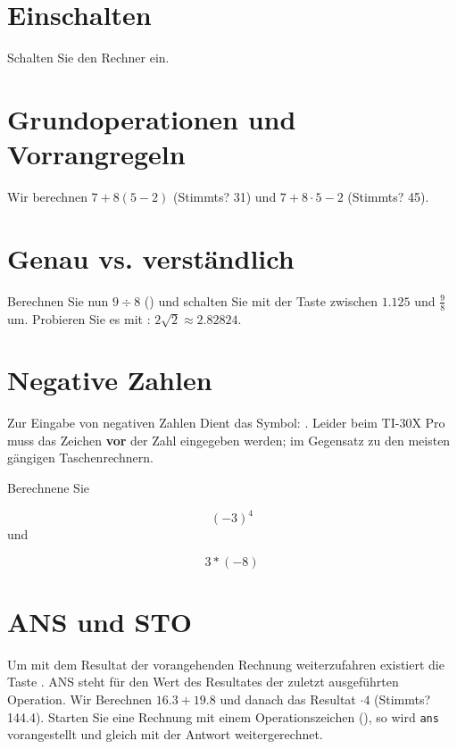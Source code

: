 

\renewcommand{\metaHeaderLine}{Arbeitsblatt}
\renewcommand{\arbeitsblattTitel}{Taschenrechner TI-30 Pro MathPrint
--- Einführung}

\arbeitsblattHeader{}

\section{Einschalten}
Schalten Sie den Rechner ein. 


\section{Grundoperationen und Vorrangregeln}
Wir berechnen $7 + 8(5-2)$  (Stimmts? 31) und $7 + 8\cdot 5 - 2$ (Stimmts? 45).

\section{Genau vs. verständlich}
Berechnen Sie nun $9 \div 8$ () und schalten Sie mit der
Taste  zwischen $1.125$ und $\frac{9}{8}$ um.
Probieren Sie es mit    :
$2\sqrt{2} \approx 2.82824$. 

\section{Negative Zahlen}
Zur Eingabe von negativen Zahlen Dient das
Symbol: . Leider beim TI-30X Pro muss das
Zeichen \textbf{vor} der Zahl eingegeben werden; im Gegensatz zu den
meisten gängigen Taschenrechnern.

Berechnene Sie

$$(-3)^4$$
und

$$3* (-8)$$

\section{ANS und STO}
Um mit dem Resultat der vorangehenden Rechnung weiterzufahren
existiert die Taste  . ANS steht für den Wert des
Resultates der zuletzt ausgeführten Operation. Wir Berechnen $16.3 +
19.8$ und danach das Resultat $\cdot4$ (Stimmts? 144.4). Starten Sie
eine Rechnung mit einem Operationszeichen (\zB {}), so
wird \texttt{ans} vorangestellt und gleich mit der Antwort weitergerechnet.

